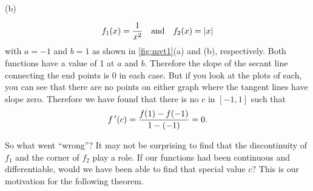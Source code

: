 \begin{example}
{
\\(b)}
%
\[f_1(x)=\frac{1}{x^2}\quad \text{and} \quad f_2(x) = \left\lvert x \right\rvert\]
with $a=-1$ and $b=1$ as shown in \autoref{fig:mvt1}(a) and (b), respectively. Both functions have a value of 1 at $a$ and $b$.  Therefore the slope of the secant line connecting the end points is $0$ in each case.  But if you look at the plots of each, you can see that there are no points on either graph where the tangent lines have slope zero. Therefore we have found that there is no $c$ in $[-1,1]$ such that \[f\,'(c) = \frac{f(1)-f(-1)}{1-(-1)} = 0.\]
\end{example}

So what went ``wrong\primeskip''?  It may not be surprising to find that the discontinuity of $f_1$ and the corner of $f_2$ play a role.  If our functions had been continuous and differentiable, would we have been able to find that special value $c$? This is our motivation for the following theorem.

